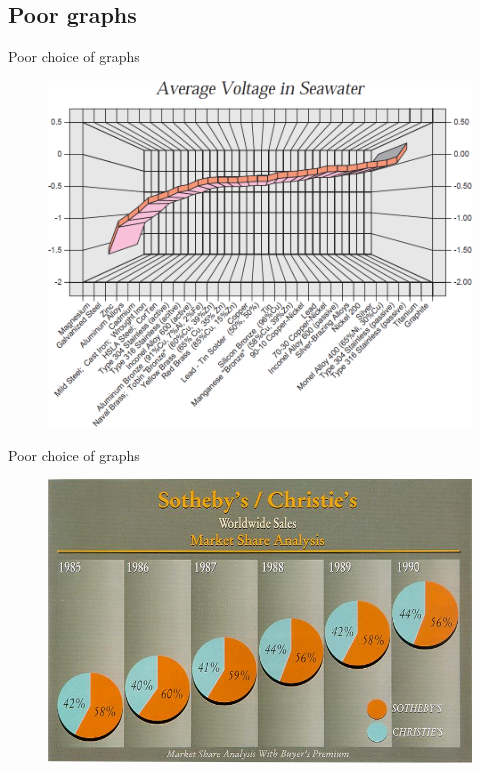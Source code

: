 \documentclass[12pt,english,pdf,dvipsnames,handout]{beamer}
\begin{document}
\subsection{Poor graphs}
\begin{frame}{Poor choice of graphs}

\begin{figure}
	\centering
	\includegraphics[scale=0.38]{../04-graphs/19_Voltage_trend}
\end{figure}

\end{frame}


\begin{frame}{Poor choice of graphs}

\begin{figure}
	\centering
	\includegraphics[scale=0.55]{../04-graphs/20_Sotheby_Christie}
\end{figure}

\end{frame}
\end{document}
